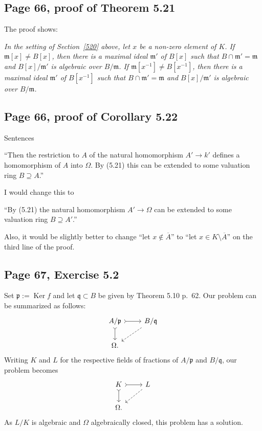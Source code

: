 \documentclass[parskip=half,fontsize=12pt]{scrartcl}%
\newcommand{\oo}{\operatorname}\newcommand{\ooo}{\operatorname*}
\newcommand{\mf}{\mathfrak}
\newcommand{\mmm}{\mf m}
\newcommand{\ppp}{\mf p}
\newcommand{\qqq}{\mf q}
\begin{document}
\subsection{Page 66, proof of Theorem 5.21}\label{521p}%

The proof shows:

\emph{In the setting of Section~\ref{520} above, let $x$ be a non-zero element of $K$. If $\mmm[x]\ne B[x]$, then there is a maximal ideal $\mmm'$ of $B[x]$ such that $B\cap\mmm'=\mmm$ %
and $B[x]/\mmm'$ is algebraic over $B/\mmm$. If $\mmm[x^{-1}]\ne B[x^{-1}]$, then there is a maximal ideal $\mmm'$ of $B[x^{-1}]$ such that $B\cap\mmm'=\mmm$ %
and $B[x]/\mmm'$ is algebraic over $B/\mmm$.}

\subsection{Page 66, proof of Corollary 5.22}%

Sentences

``Then the restriction to $A$ of the natural homomorphism $A'\to k'$ defines a homomorphism of $A$ into $\Omega$. By (5.21) this can be extended to some valuation ring $B\supseteq A$.''

I would change this to 

``By (5.21) the natural homomorphism $A'\to\Omega$ can be extended to some valuation ring $B\supseteq A'$.'' %

Also, it would be slightly better to change ``let $x\notin\overline A$'' to ``let $x\in K\setminus\overline A$'' on the third line of the proof.%

\subsection{Page 67, Exercise 5.2}\label{67}%

Set $\ppp:=\oo{Ker}f$ and let $\qqq\subset B$ be given by Theorem 5.10 p.~62. Our problem can be summarized as follows: 
$$
\begin{tikzcd}
A/\ppp\ar[r,tail]\ar[d,tail]&B/\qqq\ar[dl,dashrightarrow]\\ 
\Omega.
\end{tikzcd}
$$ 
Writing $K$ and $L$ for the respective fields of fractions of $A/\ppp$ and $B/\qqq$, our problem becomes  
$$
\begin{tikzcd}
K\ar[r,tail]\ar[d,tail]&L\ar[dl,dashrightarrow]\\ 
\Omega.
\end{tikzcd}
$$ 
As $L/K$ is algebraic and $\Omega$ algebraically closed, this problem has a solution.
\end{document}
